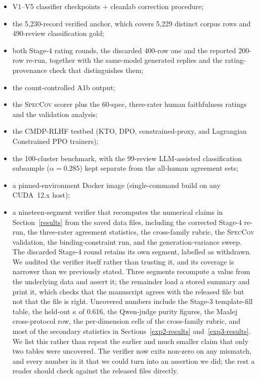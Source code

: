 \documentclass[sigconf, anonymous]{acmart}
\begin{document}
\begin{itemize}\setlength{\itemsep}{1pt}
\item V1--V5 classifier checkpoints + cleanlab correction procedure;
\item the 5{,}230-record verified anchor, which covers 5{,}229 distinct corpus rows and 490-review classification gold;
\item both Stage-4 rating rounds, the discarded 400-row one and the reported 200-row re-run, together with the same-model generated replies and the rating-provenance check that distinguishes them;
\item the count-controlled A1b output;
\item the \textsc{SpecCov} scorer plus the 60-spec, three-rater human faithfulness ratings and the validation analysis;
\item the CMDP-RLHF testbed (KTO, DPO, constrained-proxy, and Lagrangian Constrained PPO trainers);
\item the 100-cluster benchmark, with the 99-review LLM-assisted classification subsample ($\alpha = 0.285$) kept separate from the all-human agreement sets;
\item a pinned-environment Docker image (single-command build on any CUDA~12.x host);
\item a nineteen-segment verifier that recomputes the numerical claims in Section~\ref{results}
from the saved data files, including the corrected Stage-4 re-run, the three-rater agreement
statistics, the cross-family rubric, the \textsc{SpecCov} validation, the binding-constraint run,
and the generation-variance sweep. The discarded Stage-4 round retains its own segment, labelled
as withdrawn. We audited the verifier itself rather than trusting it, and its coverage is
narrower than we previously stated. Three segments recompute a value from the underlying data and
assert it; the remainder load a stored summary and print it, which checks that the manuscript
agrees with the released file but not that the file is right. Uncovered numbers include the
Stage-3 template-fill table, the held-out $\kappa$ of 0.616, the Qwen-judge purity figures, the
Maalej cross-protocol row, the per-dimension cells of the cross-family rubric, and most of the
secondary statistics in Sections~\ref{exp2-results} and~\ref{exp3-results}. We list this rather
than repeat the earlier and much smaller claim that only two tables were uncovered. The verifier
now exits non-zero on any mismatch, and every number in it that we could turn into an assertion
we did; the rest a reader should check against the released files directly.
\end{itemize}
\end{document}
